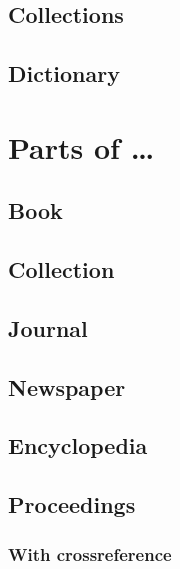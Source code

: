 \documentclass[a4paper]{article}
\begin{document}
\subsection{Collections}

\subsection{Dictionary}


\section{Parts of \ldots}

\subsection{Book}

\subsection{Collection}

\subsection{Journal}

\subsection{Newspaper}

\subsection{Encyclopedia}

\subsection{Proceedings}

\subsubsection{With crossreference}
\end{document}
